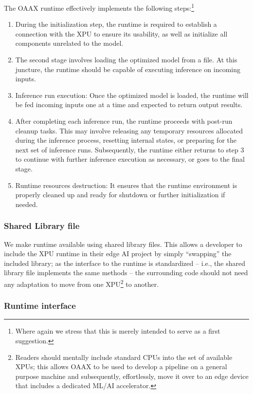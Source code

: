 \documentclass{article}
\begin{document}
The OAAX runtime effectively implements the following steps:\footnote{Where again we stress that this is merely intended to serve as a first suggestion.}

\begin{enumerate}
\item During the initialization step, the runtime is required to establish a connection with the XPU to ensure its usability, as well as initialize all components unrelated to the model.
\item The second stage involves loading the optimized model from a file. At this juncture, the runtime should be capable of executing inference on incoming inputs.
\item Inference run execution: Once the optimized model is loaded, the runtime will be fed incoming inputs one at a time and expected to return output results.
\item After completing each inference run, the runtime proceeds with post-run cleanup tasks. This may involve releasing any temporary resources allocated during the inference process, resetting internal states, or preparing for the next set of inference runs. Subsequently, the runtime either returns to step 3 to continue with further inference execution as necessary, or goes to the final stage.
\item Runtime resources destruction: It ensures that the runtime environment is properly cleaned up and ready for shutdown or further initialization if needed.
\end{enumerate}

\subsubsection{Shared Library file}

We make runtime available using shared library files. This allows a developer to include the XPU runtime in their edge AI project by simply ``swapping'' the included library; as the interface to the runtime is standardized -- i.e., the shared library file implements the same methods -- the surrounding code should not need any adaptation to move from one XPU\footnote{Readers should mentally include standard CPUs into the set of available XPUs; this allows OAAX to be used to develop a pipeline on a general purpose machine and subsequently, effortlessly, move it over to an edge device that includes a dedicated ML/AI accelerator.} to another.

\subsubsection{Runtime interface}
\end{document}
